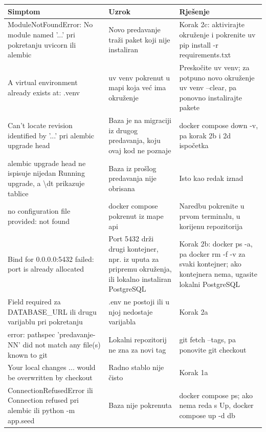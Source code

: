 \documentclass[11pt,a4paper]{article}
\newcommand{\code}[1]{{\ttfamily\small #1}}
\newcommand{\zaglavlje}{\rowcolor{tint}}
\begin{document}
\begin{center}\small
\begin{tabularx}{\linewidth}{P{4.6cm}P{3.8cm}L}
\toprule
\zaglavlje \textbf{Simptom} & \textbf{Uzrok} & \textbf{Rješenje}\\
\midrule
\code{ModuleNotFoundError: No module named '...'} pri pokretanju \code{uvicorn} ili \code{alembic} &
  Novo predavanje traži paket koji nije instaliran &
  Korak 2c: aktivirajte okruženje i pokrenite \code{uv pip install -r requirements.txt}\\
\code{A virtual environment already exists at: .venv} &
  \code{uv venv} pokrenut u mapi koja već ima okruženje &
  Preskočite \code{uv venv}; za potpuno novo okruženje \code{uv venv --clear}, pa ponovno
  instalirajte pakete\\
\code{Can't locate revision identified by '...'} pri \code{alembic upgrade head} &
  Baza je na migraciji iz drugog predavanja, koju ovaj kod ne poznaje &
  \code{docker compose down -v}, pa korak 2b i 2d ispočetka\\
\code{alembic upgrade head} ne ispisuje nijedan \code{Running upgrade}, a \code{\textbackslash dt} prikazuje tablice &
  Baza iz prošlog predavanja nije obrisana & Isto kao redak iznad\\
\code{no configuration file provided: not found} &
  \code{docker compose} pokrenut iz mape \code{api} &
  Naredbu pokrenite u prvom terminalu, u korijenu repozitorija\\
\code{Bind for 0.0.0.0:5432 failed: port is already allocated} &
  Port 5432 drži drugi kontejner, npr. iz uputa za pripremu okruženja, ili lokalno
  instaliran PostgreSQL &
  Korak 2b: \code{docker ps -a}, pa \code{docker rm -f -v} za svaki kontejner; ako kontejnera
  nema, ugasite lokalni PostgreSQL\\
\code{Field required} za \code{DATABASE\_URL} ili drugu varijablu pri pokretanju &
  \code{.env} ne postoji ili u njoj nedostaje varijabla & Korak 2a\\
\code{error: pathspec 'predavanje-NN' did not match any file(s) known to git} &
  Lokalni repozitorij ne zna za novi tag & \code{git fetch --tags}, pa ponovite \code{git checkout}\\
\code{Your local changes ... would be overwritten by checkout} &
  Radno stablo nije čisto & Korak 1a\\
\code{ConnectionRefusedError} ili \code{Connection refused} pri \code{alembic} ili \code{python -m app.seed} &
  Baza nije pokrenuta &
  \code{docker compose ps}; ako nema reda s \code{Up}, \code{docker compose up -d db}\\
\bottomrule
\end{tabularx}
\end{center}
\end{document}

